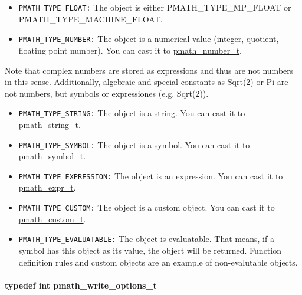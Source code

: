 \begin{itemize}
\item {\tt PMATH\_\-TYPE\_\-FLOAT:} The object is either PMATH\_\-TYPE\_\-MP\_\-FLOAT or PMATH\_\-TYPE\_\-MACHINE\_\-FLOAT.\end{itemize}


\begin{itemize}
\item {\tt PMATH\_\-TYPE\_\-NUMBER:} The object is a numerical value (integer, quotient, floating point number). You can cast it to \hyperlink{classpmath__number__t}{pmath\_\-number\_\-t}.\end{itemize}


Note that complex numbers are stored as expressions and thus are not numbers in this sense. Additionally, algebraic and special constants as Sqrt(2) or Pi are not numbers, but symbols or expressiones (e.g. Sqrt(2)).

\begin{itemize}
\item {\tt PMATH\_\-TYPE\_\-STRING:} The object is a string. You can cast it to \hyperlink{classpmath__string__t}{pmath\_\-string\_\-t}.\end{itemize}


\begin{itemize}
\item {\tt PMATH\_\-TYPE\_\-SYMBOL:} The object is a symbol. You can cast it to \hyperlink{classpmath__symbol__t}{pmath\_\-symbol\_\-t}.\end{itemize}


\begin{itemize}
\item {\tt PMATH\_\-TYPE\_\-EXPRESSION:} The object is an expression. You can cast it to \hyperlink{classpmath__expr__t}{pmath\_\-expr\_\-t}.\end{itemize}


\begin{itemize}
\item {\tt PMATH\_\-TYPE\_\-CUSTOM:} The object is a custom object. You can cast it to \hyperlink{classpmath__custom__t}{pmath\_\-custom\_\-t}.\end{itemize}


\begin{itemize}
\item {\tt PMATH\_\-TYPE\_\-EVALUATABLE:} The object is evaluatable. That means, if a symbol has this object as its value, the object will be returned. Function definition rules and custom objects are an example of non-evalutable objects. \end{itemize}
\hypertarget{group__objects_gd83ea6a616c49cbe35b5d3dafb877f7e}{
\paragraph[{pmath\_\-write\_\-options\_\-t}]{\setlength{\rightskip}{0pt plus 5cm}typedef int {\bf pmath\_\-write\_\-options\_\-t}}\hfill}
\label{group__objects_gd83ea6a616c49cbe35b5d3dafb877f7e}


